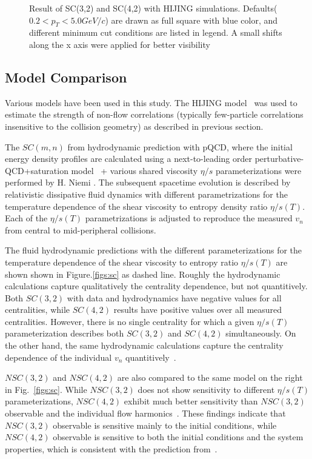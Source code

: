 \begin{figure}[h]
\begin{center}
        \caption{Result of SC(3,2) and SC(4,2) with HIJING simulations. Defaults($0.2 < p_T < 5.0GeV/c$) are drawn as full square with blue color, and different minimum cut conditions are listed in legend. A small shifts along the x axis were applied for better visibility}
        \label{fig:results_HIJING}
        \end{center}   
     \end{figure}



 \subsection{Model Comparison}

Various models have been used in this study. The {HIJING} model~\cite{Wang:1991hta,Gyulassy:1994ew} was used to estimate the strength of non-flow correlations (typically few-particle correlations insensitive to the collision geometry) as described in previous section. 

The $SC(m,n)$ from hydrodynamic prediction with pQCD, where the initial energy density profiles are calculated using a next-to-leading order perturbative-QCD+saturation model~\cite{Paatelainen:2012at,Paatelainen:2013eea} + various shared viscosity $\eta/s$ parameterizations were performed by H. Niemi \cite{Niemi:2015qia}. The subsequent spacetime evolution is described by relativistic dissipative fluid dynamics with different parametrizations for the temperature dependence of the shear viscosity to entropy density ratio $\eta/s(T)$. Each of the $\eta/s(T)$ parametrizations is adjusted to reproduce the measured $v_n$ from central to mid-peripheral collisions. 

 The fluid hydrodynamic predictions with the different parameterizations for the temperature dependence of the shear viscosity to entropy ratio $\eta/s(T)$ are shown shown in Figure.\ref{figs:sc} as dashed line. Roughly the hydrodynamic calculations capture qualitatively the centrality dependence, but not quantitively. Both $SC(3,2)$ with data and hydrodynamics have negative values for all centralities, while $SC(4,2)$ results have positive values over all measured centralities. However, there is no single centrality for which a given $\eta/s(T)$ parameterization describes both $SC(3,2)$ and $SC(4,2)$ simultaneously. On the other hand, the same hydrodynamic calculations capture the centrality dependence of the individual $v_n$ quantitively~\cite{Eskola:2015uda}.

$NSC(3,2)$ and $NSC(4,2)$ are also compared to the same model on the right in Fig.~\ref{figs:sc}. 
While $NSC(3,2)$ does not show sensitivity to  different $\eta/s(T)$ parameterizations,  $NSC(4,2)$ exhibit much better sensitivity
than $NSC(3,2)$ observable and the individual flow harmonics~\cite{Niemi:2015qia}.
These findings indicate that $NSC(3,2)$ observable is sensitive mainly to the initial conditions, while $NSC(4,2)$ observable is sensitive to both the initial conditions and the system properties, which is consistent with the prediction from~\cite{Niemi:2012aj}.


